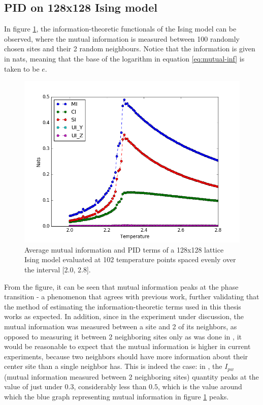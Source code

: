 \documentclass[12pt]{article}
\begin{document}
\subsection{PID on 128x128 Ising model}

In figure \ref{fig:ising-128-pid-2-nbs}, the information-theoretic functionals of the Ising model can be observed, where the mutual information is measured between 100 randomly chosen sites and their 2 random neighbours. Notice that the information is given in nats, meaning that the base of the logarithm in equation \ref{eq:mutual-inf} is taken to be $e$. 

\begin{figure} [h!]
\begin{center}
\includegraphics[width=\textwidth]{ising-128-pid-2-nbs}
\caption{Average mutual information and PID terms of a 128x128 lattice Ising model evaluated at 102 temperature points spaced evenly over the interval [2.0, 2.8].}
\label{fig:ising-128-pid-2-nbs}
\end{center}
\end{figure}

From the figure, it can be seen that mutual information peaks at the phase transition - a phenomenon that agrees with previous work, further validating that the method of estimating the information-theoretic terms used in this thesis works as expected. In addition, since in the experiment under discussion, the mutual information was measured between a site and 2 of its neighbors, as opposed to measuring it between 2 neighboring sites only as was done in \cite{barnett-ising}, it would be reasonable to expect that the mutual information is higher in current experiments, because two neighbors should have more information about their center site than a single neighbor has. This is indeed the case: in \cite{barnett-ising}, the $I_{pw}$ (mutual information measured between 2 neighboring sites) quantity  peaks at the value of just under $0.3$, considerably less than $0.5$, which is the value around which the blue graph representing mutual information in figure \ref{fig:ising-128-pid-2-nbs} peaks. 
\end{document}
